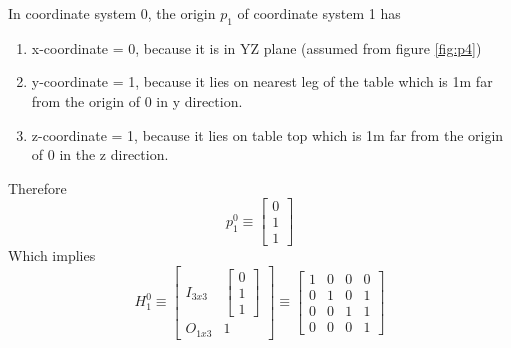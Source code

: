 \documentclass[12pt]{article}
\begin{document}
In coordinate system 0, the origin $ p_{1} $ of coordinate system 1 has
\begin{enumerate}[nolistsep]
  \item x-coordinate = 0, because it is in YZ plane (assumed from figure \ref{fig:p4})
  \item y-coordinate = 1, because it lies on nearest leg of the table which is 1m far from the origin of 0 in y direction.
  \item z-coordinate = 1, because it lies on table top which is 1m far from the origin of 0 in the z direction.
\end{enumerate}
Therefore
\[
  p_{1}^{0} \equiv \begin{bmatrix} 0 \\ 1 \\ 1 \end{bmatrix}
\]
Which implies
\[
  H_{1}^{0}
  \equiv \begin{bmatrix} I_{3x3} & \begin{bmatrix} 0 \\ 1 \\ 1 \end{bmatrix} \\ O_{1x3} & 1 \end{bmatrix}
  \equiv \begin{bmatrix}
          1 & 0 & 0 & 0\\
          0 & 1 & 0 & 1\\
          0 & 0 & 1 & 1\\
          0 & 0 & 0 & 1
        \end{bmatrix}
\]
\end{document}
